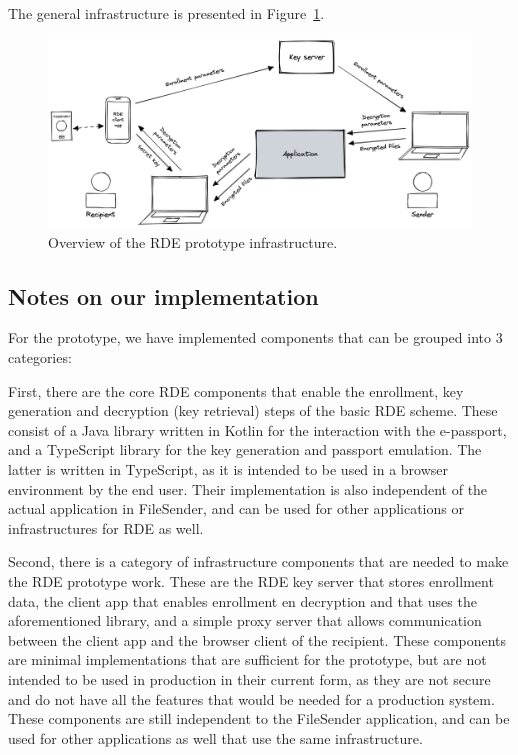 The general infrastructure is presented in Figure~\ref{fig:rde-prototype-infrastructure-overview}.
\begin{figure}
    \centering
    \includegraphics[width=\textwidth]{imgs/RDE infra overview}
    \caption{Overview of the RDE prototype infrastructure.}
    \label{fig:rde-prototype-infrastructure-overview}
\end{figure}

\subsection{Notes on our implementation}\label{subsec:infrastructure-overview-notes-on-our-implementation}
For the prototype, we have implemented components that can be grouped into 3 categories:

First, there are the core RDE components that enable the enrollment, key generation and decryption (key retrieval) steps of the basic RDE scheme.
These consist of a Java library written in Kotlin for the interaction with the e-passport, and a TypeScript library for the key generation and passport emulation.
The latter is written in TypeScript, as it is intended to be used in a browser environment by the end user.
Their implementation is also independent of the actual application in FileSender, and can be used for other applications or infrastructures for RDE as well.

Second, there is a category of infrastructure components that are needed to make the RDE prototype work.
These are the RDE key server that stores enrollment data, the client app that enables enrollment en decryption and that uses the aforementioned library, and a simple proxy server that allows communication between the client app and the browser client of the recipient.
These components are minimal implementations that are sufficient for the prototype, but are not intended to be used in production in their current form, as they are not secure and do not have all the features that would be needed for a production system.
These components are still independent to the FileSender application, and can be used for other applications as well that use the same infrastructure.

